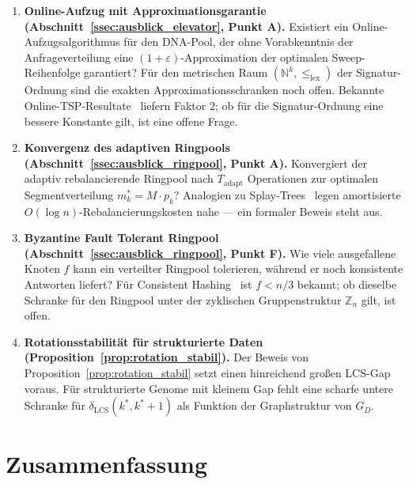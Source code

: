 ﻿\documentclass[a4paper,12pt]{article}
\theoremstyle{definition}
\theoremstyle{plain}
\begin{document}
\begin{enumerate}
  \item \textbf{Online-Aufzug mit Approximationsgarantie
        (Abschnitt~\ref{ssec:ausblick_elevator}, Punkt A).}
        Existiert ein Online-Aufzugsalgorithmus für den DNA-Pool, der
        ohne Vorabkenntnis der Anfrageverteilung eine
        $(1+\varepsilon)$-Approximation der optimalen Sweep-Reihenfolge
        garantiert?  Für den metrischen Raum
        $(\mathbb{N}^k, \le_{\mathrm{lex}})$ der Signatur-Ordnung sind
        die exakten Approximationsschranken noch offen.  Bekannte
        Online-TSP-Resultate~\cite{knuth1998} liefern Faktor $2$;
        ob für die Signatur-Ordnung eine bessere Konstante gilt,
        ist eine offene Frage.

  \item \textbf{Konvergenz des adaptiven Ringpools
        (Abschnitt~\ref{ssec:ausblick_ringpool}, Punkt A).}
        Konvergiert der adaptiv rebalancierende Ringpool nach
        $T_{\mathrm{adapt}}$ Operationen zur optimalen Segmentverteilung
        $m_k^* = M \cdot p_k$?  Analogien zu Splay-Trees~\cite{sleator1985}
        legen amortisierte $O(\log n)$-Rebalancierungskosten nahe ---
        ein formaler Beweis steht aus.

  \item \textbf{Byzantine Fault Tolerant Ringpool
        (Abschnitt~\ref{ssec:ausblick_ringpool}, Punkt F).}
        Wie viele ausgefallene Knoten $f$ kann ein verteilter Ringpool
        tolerieren, während er noch konsistente Antworten liefert?
        Für Consistent Hashing~\cite{karger1997} ist $f < n/3$ bekannt;
        ob dieselbe Schranke für den Ringpool unter der zyklischen
        Gruppenstruktur $\mathbb{Z}_n$ gilt, ist offen.

  \item \textbf{Rotationsstabilität für strukturierte Daten
        (Proposition~\ref{prop:rotation_stabil}).}
        Der Beweis von Proposition~\ref{prop:rotation_stabil} setzt
        einen hinreichend großen LCS-Gap voraus.  Für strukturierte
        Genome mit kleinem Gap fehlt eine scharfe untere Schranke für
        $\delta_{\mathrm{LCS}}(k^*, k^*+1)$ als Funktion der
        Graphstruktur von $G_D$.
\end{enumerate}

\section{Zusammenfassung}
\label{sec:zusammenfassung}
\end{document}
